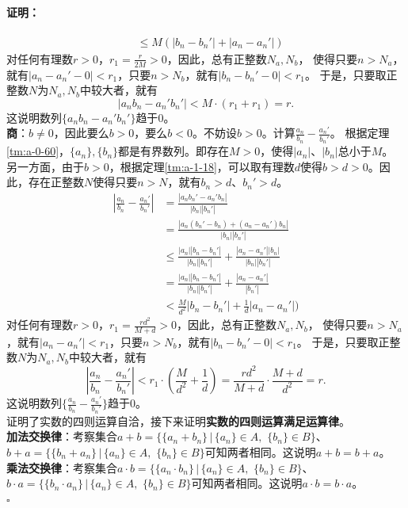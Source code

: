 \documentclass[12pt,UTF8]{ctexbook}
\renewenvironment{proof}{\paragraph{\textbf{证明：}}}{\hfill$\square$}
\begin{document}
\begin{appendix}
\begin{proof}
\begin{align*}
        &\leqslant M(|b_n - b_n'| + |a_n - a_n'|)  
    \end{align*}
    对任何有理数$r>0$，$r_1 = \frac{r}{2M}>0$，因此，总有正整数$N_a,N_b$，
    使得只要$n>N_a$，就有$|a_n - a_n' - 0| < r_1$，只要$n>N_b$，就有$|b_n - b_n' - 0| < r_1$。
    于是，只要取正整数$N$为$N_a,N_b$中较大者，就有
    $$ |a_nb_n - a_n'b_n'| < M\cdot \left(r_1 + r_1\right) = r.$$
    这说明数列$\{a_nb_n - a_n'b_n'\}$趋于$0$。\\
    \textbf{商}：$b\neq 0$，因此要么$b>0$，要么$b<0$。不妨设$b>0$。计算$\frac{a_n}{b_n} - \frac{a_n'}{b_n'}$。
    根据定理\ref{tm:a-0-60}，$\{a_n\}, \{b_n\}$都是有界数列。即存在$M>0$，使得$|a_n|$、$|b_n|$总小于$M$。
    另一方面，由于$b>0$，根据定理\ref{tm:a-1-18}，可以取有理数$d$使得$b>d>0$。因此，存在正整数$N$使得只要$n>N$，就有$b_n>d$、$b_n'>d$。
    \begin{align*}
        \left|\frac{a_n}{b_n} - \frac{a_n'}{b_n'}\right| &= \frac{|a_nb_n' - a_n'b_n|}{|b_n||b_n'|}  \\
        &= \frac{|a_n(b_n' - b_n) + (a_n - a_n')b_n|}{|b_n||b_n'|}  \\
        &\leqslant \frac{|a_n||b_n - b_n'|}{|b_n||b_n'|} + \frac{|a_n - a_n'||b_n|}{|b_n||b_n'|}  \\
        &= \frac{|a_n||b_n - b_n'|}{|b_n||b_n'|} + \frac{|a_n - a_n'|}{|b_n'|}  \\
        &< \frac{M}{d^2}|b_n - b_n'| + \frac{1}{d}|a_n - a_n'|)  
    \end{align*}
    对任何有理数$r>0$，$r_1 = \frac{rd^2}{M+d}>0$，因此，总有正整数$N_a,N_b$，
    使得只要$n>N_a$，就有$|a_n - a_n'| < r_1$，只要$n>N_b$，就有$|b_n - b_n' - 0| < r_1$。
    于是，只要取正整数$N$为$N_a,N_b$中较大者，就有
    $$ \left|\frac{a_n}{b_n} - \frac{a_n'}{b_n'}\right| < r_1\cdot \left(\frac{M}{d^2} + \frac{1}{d}\right) = \frac{rd^2}{M+d}\cdot \frac{M+d}{d^2} = r.$$
    这说明数列$\{\frac{a_n}{b_n} - \frac{a_n'}{b_n'}\}$趋于$0$。\\
    证明了实数的四则运算自洽，接下来证明\textbf{实数的四则运算满足运算律}。\\
    \textbf{加法交换律}：考察集合$a + b = \{\{a_n + b_n\} \, |\, \{a_n\}\in A,\,\,\{b_n\}\in B \}$、
    $b + a = \{\{b_n + a_n\} \, |\, \{a_n\}\in A,\,\,\{b_n\}\in B \}$可知两者相同。这说明$a + b = b + a$。\\
    \textbf{乘法交换律}：考察集合$a\cdot b = \{\{a_n \cdot b_n\} \, |\, \{a_n\}\in A,\,\,\{b_n\}\in B \}$、
    $b\cdot a = \{\{b_n \cdot a_n\} \, |\, \{a_n\}\in A,\,\,\{b_n\}\in B \}$可知两者相同。这说明$a \cdot b = b \cdot a$。\\

\end{proof}
\end{appendix}
\end{document}
